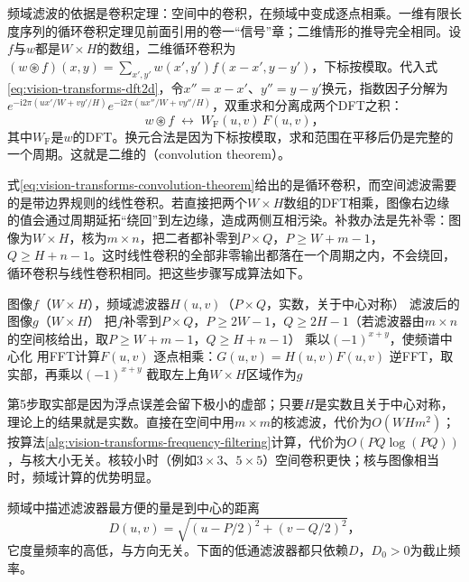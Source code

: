 频域滤波的依据是卷积定理：空间中的卷积，在频域中变成逐点相乘。一维有限长度序列的循环卷积定理见前面引用的卷一“信号”章；二维情形的推导完全相同。设$f$与$w$都是$W\times H$的数组，二维循环卷积为$(w\circledast f)(x,y)=\sum_{x',y'}w(x',y')f(x-x',y-y')$，下标按模取。代入式\eqref{eq:vision-transforms-dft2d}，令$x''=x-x'$、$y''=y-y'$换元，指数因子分解为$e^{-\mathrm{i}2\pi(ux'/W+vy'/H)}e^{-\mathrm{i}2\pi(ux''/W+vy''/H)}$，双重求和分离成两个DFT之积：
\begin{equation}
  w\circledast f\;\longleftrightarrow\;W_{\mathrm{F}}(u,v)\,F(u,v)\text{，}
  \label{eq:vision-transforms-convolution-theorem}
\end{equation}
其中$W_{\mathrm{F}}$是$w$的DFT。换元合法是因为下标按模取，求和范围在平移后仍是完整的一个周期。这就是二维的（convolution theorem）。

式\eqref{eq:vision-transforms-convolution-theorem}给出的是循环卷积，而空间滤波需要的是带边界规则的线性卷积。若直接把两个$W\times H$数组的DFT相乘，图像右边缘的值会通过周期延拓“绕回”到左边缘，造成两侧互相污染。补救办法是先补零：图像为$W\times H$，核为$m\times n$，把二者都补零到$P\times Q$，$P\geq W+m-1$，$Q\geq H+n-1$。这时线性卷积的全部非零输出都落在一个周期之内，不会绕回，循环卷积与线性卷积相同。把这些步骤写成算法如下。

\begin{algorithm}[频域滤波]
  \label{alg:vision-transforms-frequency-filtering}
  \begin{algorithmic}[1]
    \Require 图像$f$（$W\times H$），频域滤波器$H(u,v)$（$P\times Q$，实数，关于中心对称）
    \Ensure 滤波后的图像$g$（$W\times H$）
    \State 把$f$补零到$P\times Q$，$P\geq2W-1$，$Q\geq2H-1$（若滤波器由$m\times n$的空间核给出，取$P\geq W+m-1$，$Q\geq H+n-1$）
    \State 乘以$(-1)^{x+y}$，使频谱中心化
    \State 用FFT计算$F(u,v)$
    \State 逐点相乘：$G(u,v)=H(u,v)F(u,v)$
    \State 逆FFT，取实部，再乘以$(-1)^{x+y}$
    \State 截取左上角$W\times H$区域作为$g$
  \end{algorithmic}
\end{algorithm}

第5步取实部是因为浮点误差会留下极小的虚部；只要$H$是实数且关于中心对称，理论上的结果就是实数。直接在空间中用$m\times m$的核滤波，代价为$O(WHm^2)$；按算法\ref{alg:vision-transforms-frequency-filtering}计算，代价为$O(PQ\log(PQ))$，与核大小无关。核较小时（例如$3\times3$、$5\times5$）空间卷积更快；核与图像相当时，频域计算的优势明显。

频域中描述滤波器最方便的量是到中心的距离
\[
  D(u,v)=\sqrt{(u-P/2)^2+(v-Q/2)^2}\text{，}
\]
它度量频率的高低，与方向无关。下面的低通滤波器都只依赖$D$，$D_0>0$为截止频率。


